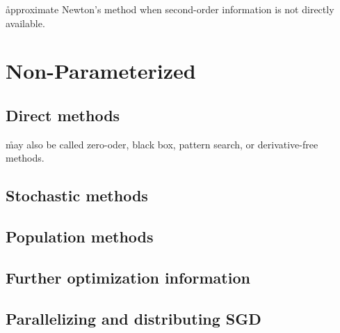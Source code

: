 \r{approximate Newton's method when second-order information is not directly available.}

\section{Non-Parameterized}

\subsection{Direct methods}

\r{may also be called zero-oder, black box, pattern search, or derivative-free methods.}

\subsection{Stochastic methods}

\subsection{Population methods}

\subsection{Further optimization information}


\subsection{Parallelizing and distributing SGD}


